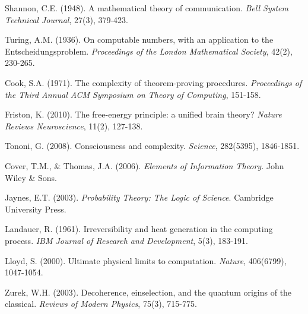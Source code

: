 \documentclass[11pt]{article}
\theoremstyle{definition}
\theoremstyle{remark}
\begin{document}

\begin{thebibliography}{99}

Shannon, C.E. (1948). A mathematical theory of communication. \textit{Bell System Technical Journal}, 27(3), 379-423.

Turing, A.M. (1936). On computable numbers, with an application to the Entscheidungsproblem. \textit{Proceedings of the London Mathematical Society}, 42(2), 230-265.

Cook, S.A. (1971). The complexity of theorem-proving procedures. \textit{Proceedings of the Third Annual ACM Symposium on Theory of Computing}, 151-158.

Friston, K. (2010). The free-energy principle: a unified brain theory? \textit{Nature Reviews Neuroscience}, 11(2), 127-138.

Tononi, G. (2008). Consciousness and complexity. \textit{Science}, 282(5395), 1846-1851.

Cover, T.M., \& Thomas, J.A. (2006). \textit{Elements of Information Theory}. John Wiley \& Sons.

Jaynes, E.T. (2003). \textit{Probability Theory: The Logic of Science}. Cambridge University Press.

Landauer, R. (1961). Irreversibility and heat generation in the computing process. \textit{IBM Journal of Research and Development}, 5(3), 183-191.

Lloyd, S. (2000). Ultimate physical limits to computation. \textit{Nature}, 406(6799), 1047-1054.

Zurek, W.H. (2003). Decoherence, einselection, and the quantum origins of the classical. \textit{Reviews of Modern Physics}, 75(3), 715-775.

\end{thebibliography}
\end{document}
